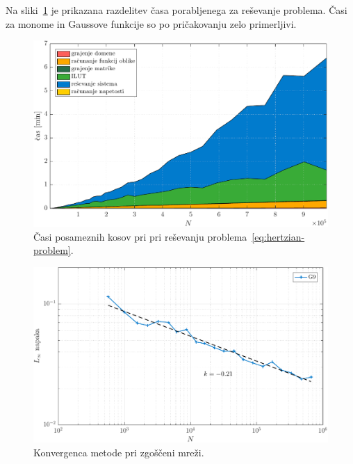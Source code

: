 \documentclass[12pt,a4paper,twoside]{article}
\theoremstyle{definition} %
\theoremstyle{plain} %
\numberwithin{equation}{section}
\newlength{\iw}
\begin{document}
Na sliki~\ref{fig:hertz-time} je prikazana razdelitev časa porabljenega za reševanje problema. Časi
za monome in Gaussove funkcije so po pričakovanju zelo primerljivi.

\begin{figure}[h]
  \centering
  \includegraphics[width=\iw]{images/hertzian_time.pdf}
  \caption{Časi posameznih kosov pri pri reševanju problema~\eqref{eq:hertzian-problem}.}
  \label{fig:hertz-time}
\end{figure}

\begin{figure}[h]
  \centering
  \includegraphics[width=\iw]{images/hertzian_refined_convergence.pdf}
  \caption{Konvergenca metode pri zgoščeni mreži.}
  \label{fig:hertz-refined-convergence}
\end{figure}
\end{document}
